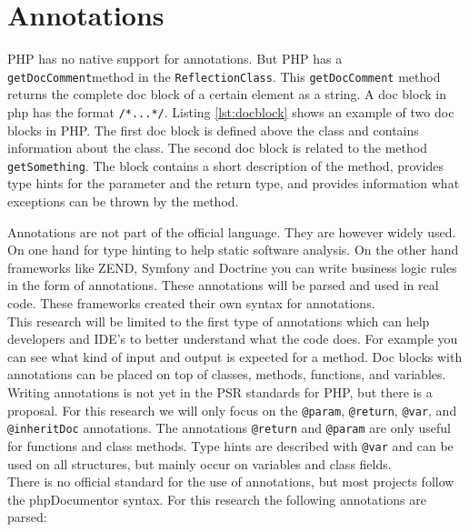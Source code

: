 \documentclass[../main.tex]{subfiles}
\begin{document}
    \section{Annotations}\label{sec:background_annotations}
    PHP has no native support for annotations.
    But PHP has a \texttt{getDocComment}\footnotemark method in the \texttt{ReflectionClass}. 
    This \texttt{getDocComment} method returns the complete doc block of a certain element as a string.
    A doc block in php has the format \texttt{\slash**...*\slash}.
    Listing \ref{lst:docblock} shows an example of two doc blocks in PHP.
    The first doc block is defined above the class and contains information about the class.
    The second doc block is related to the method \texttt{getSomething}. 
    The block contains a short description of the method, provides type hints for the parameter and the return type, and provides information what exceptions can be thrown by the method. 
    
    
    

    Annotations are not part of the official language.
    They are however widely used.
    On one hand for type hinting to help static software analysis.
    On the other hand frameworks like ZEND, Symfony and Doctrine you can write business logic rules in the form of annotations.
    These annotations will be parsed and used in real code.
    These frameworks created their own syntax for annotations.
    \\
    This research will be limited to the first type of annotations which can help developers and IDE's to better understand what the code does.
    For example you can see what kind of input and output is expected for a method.
    Doc blocks with annotations can be placed on top of classes, methods, functions, and variables.
    \\
    Writing annotations is not yet in the PSR standards for PHP, but there is a proposal\footnotemark.
    For this research we will only focus on the \texttt{@param}, \texttt{@return}, \texttt{@var}, and \texttt{@inheritDoc} annotations.
    The annotations \texttt{@return} and \texttt{@param} are only useful for functions and class methods. Type hints are described with \texttt{@var} and can be used on all structures, but mainly occur on variables and class fields.
    \\
    There is no official standard for the use of annotations, but most projects follow the phpDocumentor\footnotemark{} syntax.
    For this research the following annotations are parsed:
    
\end{document}
